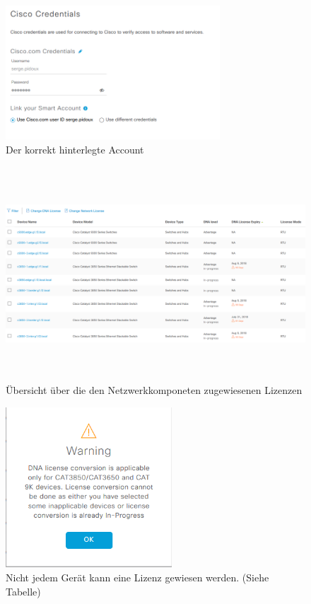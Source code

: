\begin{figure}[H]
	\centering
	\includegraphics[height=5cm]{img/LicenceManager_002.png}
	\caption{Der korrekt hinterlegte Account}
	\label{fig:dna-center-licence-5}
\end{figure}

\begin{figure}[H]
	\centering
	\includegraphics[height=8cm]{img/LicenceManager_003.png}
	\caption{Übersicht über die den Netzwerkkomponeten zugewiesenen Lizenzen}
	\label{fig:dna-center-licence-6}
\end{figure}

\begin{figure}[H]
	\centering
	\includegraphics[height=6cm]{img/LicenceManager_004.png}
	\caption{Nicht jedem Gerät kann eine Lizenz gewiesen werden. (Siehe Tabelle)}
	\label{fig:dna-center-licence-7}
\end{figure}

